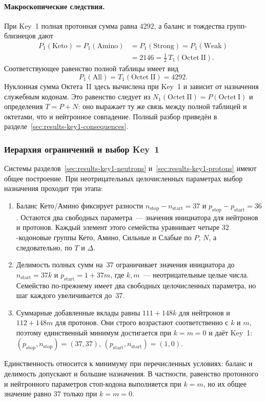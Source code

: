 \documentclass[11pt,a4paper]{article}
\renewcommand{\_}{\origunderscore\allowbreak}
\begin{document}
\paragraph{Макроскопические следствия.}
При Key~1 полная протонная сумма равна $4292$, а баланс
и тождества групп-близнецов дают
\[
\begin{aligned}
P_1(\mathrm{Keto})=P_1(\mathrm{Amino})
&=P_1(\mathrm{Strong})=P_1(\mathrm{Weak})\\
&=2146=\tfrac12\,T_1(\mathrm{Octet~II}).
\end{aligned}
\]
Соответствующее равенство полной таблицы имеет вид
\[
P_1(\mathrm{All})=T_1(\mathrm{Octet~II})=4292.
\]
Нуклонная сумма Октета~II здесь вычислена при Key~1 и
зависит от назначения служебным кодонам. Это равенство
следует из $N_1(\mathrm{Octet~II})=P(\mathrm{Octet~I})$
и определения $T=P+N$: оно выражает ту же связь между
полной таблицей и октетами, что и нейтронное совпадение.
Полный разбор приведён в
разделе~\ref{sec:results-key1-consequences}.

\subsubsection{Иерархия ограничений и выбор Key~1}
\label{sec:results-key1-uniqueness}

Системы разделов~\ref{sec:results-key1-neutrons}
и~\ref{sec:results-key1-protons} имеют общее построение.
При неотрицательных целочисленных параметрах выбор
назначения проходит три этапа:
\begin{enumerate}
\item Баланс Кето/Амино фиксирует разности
$n_{\text{stop}}-n_{\text{start}}=37$ и
$p_{\text{stop}}-p_{\text{start}}=36$.
Остаются два свободных параметра~--- значения инициатора
для нейтронов и протонов. Каждый элемент этого семейства
уравнивает четыре $32$-кодоновые группы Кето, Амино,
Сильные и Слабые по $P$, $N$, а следовательно, по $T$ и $\Delta$.
\item Делимость полных сумм на~$37$ ограничивает значения
инициатора до $n_{\text{start}}=37k$ и
$p_{\text{start}}=1+37m$, где $k,m$~--- неотрицательные
целые числа. Семейство по-прежнему имеет два свободных
целочисленных параметра, но шаг каждого увеличивается до~$37$.
\item Суммарные добавленные вклады равны $111+148k$
для нейтронов и $112+148m$ для протонов. Они строго
возрастают соответственно с $k$ и $m$, поэтому
единственный минимум достигается при $k=m=0$ и даёт Key~1:
$(p_{\text{stop}},n_{\text{stop}})=(37,37)$,
$(p_{\text{start}},n_{\text{start}})=(1,0)$.
\end{enumerate}
Единственность относится к минимуму при перечисленных
условиях: баланс и делимость допускают и большие назначения.
В частности, равенство протонного и нейтронного параметров
стоп-кодона выполняется при $k=m$, но их общее значение
равно $37$ только при $k=m=0$.
\end{document}
